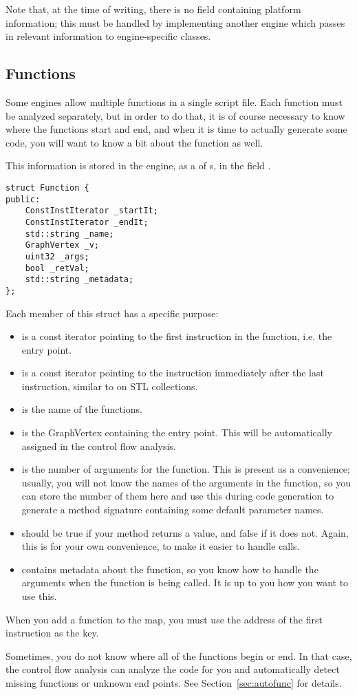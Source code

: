 Note that, at the time of writing, there is no field containing platform information; this must be handled by implementing another engine which passes in relevant information to engine-specific classes.

\subsection{Functions}
Some engines allow multiple functions in a single script file. Each function must be analyzed separately, but in order to do that, it is of course necessary to know where the functions start and end, and when it is time to actually generate some code, you will want to know a bit about the function as well.

This information is stored in the engine, as a  of s, in the field .

\begin{C++}
\begin{lstlisting}
struct Function {
public:
	ConstInstIterator _startIt;
	ConstInstIterator _endIt;
	std::string _name;
	GraphVertex _v;
	uint32 _args;
	bool _retVal;
	std::string _metadata;
};
\end{lstlisting}
\end{C++}

Each member of this struct has a specific purpose:
\begin{itemize}
\item {} is a const iterator pointing to the first instruction in the function, i.e. the entry point.
\item {} is a const iterator pointing to the instruction immediately after the last instruction, similar to  on STL collections.
\item {} is the name of the functions.
\item {} is the GraphVertex containing the entry point. This will be automatically assigned in the control flow analysis.
\item {} is the number of arguments for the function. This is present as a convenience; usually, you will not know the names of the arguments in the function, so you can store the number of them here and use this during code generation to generate a method signature containing some default parameter names.
\item {} should be true if your method returns a value, and false if it does not. Again, this is for your own convenience, to make it easier to handle calls.
\item {} contains metadata about the function, so you know how to handle the arguments when the function is being called. It is up to you how you want to use this.
\end{itemize}

When you add a function to the map, you must use the address of the first instruction as the key.

Sometimes, you do not know where all of the functions begin or end. In that case, the control flow analysis can analyze the code for you and automatically detect missing functions or unknown end points. See Section~\vref{sec:autofunc} for details.
